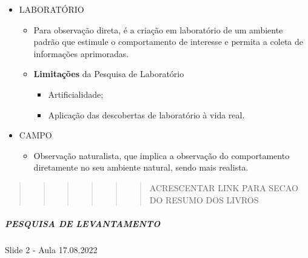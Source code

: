\documentclass[
]{book}
\providecommand{\tightlist}{%
  \setlength{\itemsep}{0pt}\setlength{\parskip}{0pt}}
\begin{document}
\begin{itemize}
\tightlist
\item
  LABORATÓRIO

  \begin{itemize}
  \tightlist
  \item
    Para observação direta, é a criação em laboratório de um ambiente padrão que estimule o comportamento de interesse e permita a coleta de informações aprimoradas.
  \item
    \textbf{Limitações} da Pesquisa de Laboratório

    \begin{itemize}
    \tightlist
    \item
      Artificialidade;
    \item
      Aplicação das descobertas de laboratório à vida real.
    \end{itemize}
  \end{itemize}
\item
  CAMPO

  \begin{itemize}
  \tightlist
  \item
    Observação naturalista, que implica a observação do comportamento diretamente no seu ambiente natural, sendo mais realista.
  \end{itemize}
\end{itemize}

\begin{quote}
\begin{quote}
\begin{quote}
\begin{quote}
\begin{quote}
\begin{quote}
ACRESCENTAR LINK PARA SECAO DO RESUMO DOS LIVROS
\end{quote}
\end{quote}
\end{quote}
\end{quote}
\end{quote}
\end{quote}

\hypertarget{pesquisa-de-levantamento}{%
\subparagraph{PESQUISA DE LEVANTAMENTO}\label{pesquisa-de-levantamento}}

Slide 2 - Aula 17.08.2022
\end{document}
